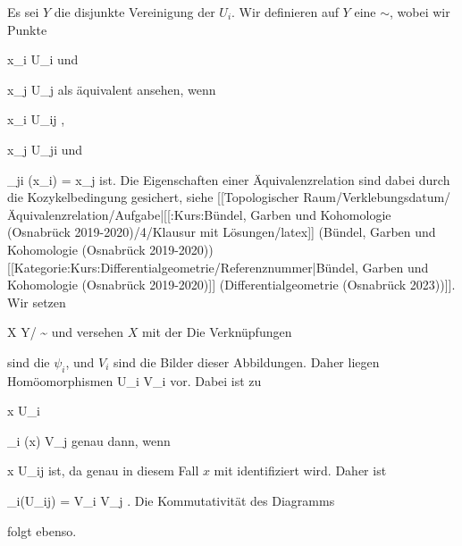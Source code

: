 {

Es sei $Y$ die disjunkte Vereinigung der $U_i$. Wir definieren auf $Y$ eine
$\sim$, wobei wir Punkte

\mavergleichskette
{\vergleichskette
{ x_i
}
{ \in }{ U_i
}
{  }{
}
{    }{
}
{   }{
}
}
{}{}{}
und

\mavergleichskette
{\vergleichskette
{ x_j
}
{ \in }{ U_j
}
{  }{
}
{    }{
}
{   }{
}
}
{}{}{}
als äquivalent ansehen, wenn

\mavergleichskette
{\vergleichskette
{ x_i
}
{ \in }{ U_{ij}
}
{  }{
}
{    }{
}
{   }{
}
}
{}{}{,}

\mavergleichskette
{\vergleichskette
{ x_j
}
{ \in }{ U_{ji}
}
{  }{
}
{    }{
}
{   }{
}
}
{}{}{}
und

\mavergleichskette
{\vergleichskette
{ \varphi_{ji} (x_i)
}
{ = }{ x_j
}
{  }{
}
{    }{
}
{   }{
}
}
{}{}{}
ist. Die Eigenschaften einer Äquivalenzrelation sind dabei durch die Kozykelbedingung gesichert, siehe
[[Topologischer Raum/Verklebungsdatum/Äquivalenzrelation/Aufgabe|[[:Kurs:Bündel, Garben und Kohomologie (Osnabrück 2019-2020)/4/Klausur mit Lösungen/latex]] (Bündel, Garben und Kohomologie (Osnabrück 2019-2020))[[Kategorie:Kurs:Differentialgeometrie/Referenznummer|Bündel, Garben und Kohomologie (Osnabrück 2019-2020)]] (Differentialgeometrie (Osnabrück 2023))]].
Wir setzen

\mavergleichskettedisp
{\vergleichskette
{X
}
{ } { Y/ \sim
}
{ } {
}
{ } {
}
{ } {
}
}
{}{}{}
und versehen $X$ mit der
Die Verknüpfungen

 {  }

sind die $\psi_i$, und $V_i$ sind die Bilder dieser Abbildungen. Daher liegen Homöomorphismen
 {U_i } { V_i
} {}
vor. Dabei ist zu

\mavergleichskette
{\vergleichskette
{ x
}
{ \in }{ U_i
}
{  }{
}
{    }{
}
{   }{
}
}
{}{}{}

\mavergleichskettedisp
{\vergleichskette
{ \psi_i (x)
}
{ \in} { V_j
}
{ } {
}
{ } {
}
{ } {
}
}
{}{}{}
genau dann, wenn

\mavergleichskette
{\vergleichskette
{ x
}
{ \in }{ U_{ij}
}
{  }{
}
{    }{
}
{   }{
}
}
{}{}{}
ist, da genau in diesem Fall $x$ mit
 identifiziert wird. Daher ist

\mavergleichskette
{\vergleichskette
{ \psi_i(U_{ij})
}
{ = }{ V_i \cap V_j
}
{  }{
}
{    }{
}
{   }{
}
}
{}{}{.}
Die Kommutativität des Diagramms

 {  }

folgt ebenso.

 }


